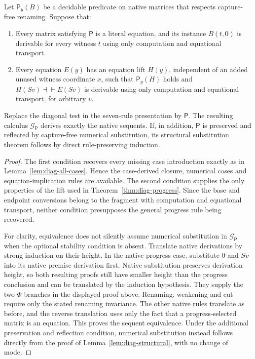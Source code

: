 \begin{proposition}
\label{prop:diag-guard-criterion}
Let $\mathsf P_y(B)$ be a decidable predicate on native matrices that
respects capture-free renaming.  Suppose that:
\begin{enumerate}
\item Every matrix satisfying $\mathsf P$ is a literal equation, and
  its instance $B(t,0)$ is derivable for every witness $t$ using only
  computation and equational transport.
\item Every equation $E(y)$ has an equation lift $H(y)$, independent
  of an added unused witness coordinate $x$, such that
  $\mathsf P_y(H)$ holds and
  $H(Sv)\dashv\vdash E(Sv)$ is derivable using only computation
  and equational transport, for arbitrary $v$.
\end{enumerate}
Replace the diagonal test in the seven-rule presentation by $\mathsf P$.
The resulting calculus $\mathcal G_{\mathsf P}$ derives exactly the
native sequents.  If, in addition, $\mathsf P$ is preserved and reflected
by capture-free numerical substitution, its structural substitution
theorem follows by direct rule-preserving induction.
\end{proposition}
\begin{proof}
The first condition recovers every missing case introduction exactly as
in Lemma~\ref{lem:diag-all-cases}.  Hence the case-derived closure,
numerical cases and equation-implication rules are available.
The second condition supplies the only properties of the lift used in
Theorem~\ref{thm:diag-progress}.  Since the base and endpoint conversions
belong to the fragment with computation and equational transport, neither
condition presupposes the general progress rule being recovered.

For clarity, equivalence does not silently assume numerical substitution
in $\mathcal G_{\mathsf P}$ when the optional stability condition is
absent.  Translate native derivations by strong induction on their height.
In the native progress case, substitute $0$ and $Sv$ into its native
premise derivation first.  Native substitution preserves derivation
height, so both resulting proofs still have smaller height than the
progress conclusion and can be translated by the induction hypothesis.
They supply the two $\Phi$ branches in the displayed proof above.
Renaming, weakening and cut require only the stated renaming invariance.
The other native rules translate as before, and the reverse translation
uses only the fact that a progress-selected matrix is an equation.
This proves the sequent equivalence.  Under the additional preservation
and reflection condition, numerical substitution instead follows directly
from the proof of Lemma~\ref{lem:diag-structural}, with no change of mode.
\end{proof}

